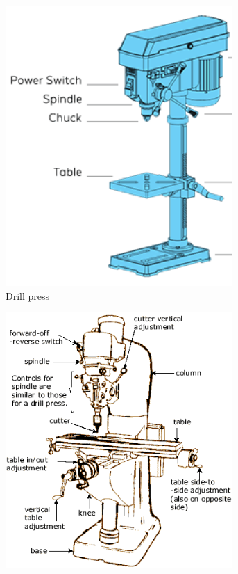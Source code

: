 \documentclass[10pt,letterpaper]{book}
\begin{document}
 \begin{figure}[H]
	\centering
	\begin{subfigure}[b]{.24\linewidth}
		\includegraphics[width=0.95\textwidth]{imgs/drillpress.png}
		\caption{Drill press}
	\end{subfigure}	\begin{subfigure}[b]{.34\linewidth}
		\includegraphics[width=0.95\textwidth]{imgs/mill.png}

\end{subfigure}
\end{figure}
\end{document}
